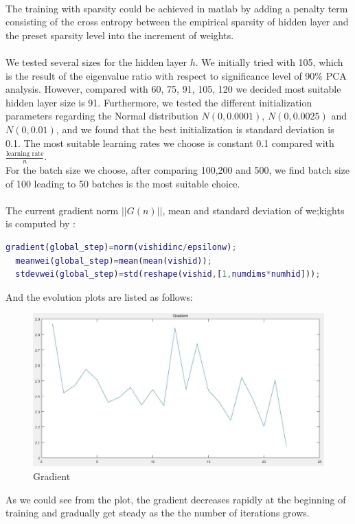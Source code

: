 \documentclass{article}
\begin{document}
\paragraph{}
The training with sparsity could be achieved in matlab by adding a penalty term consisting of the cross entropy between the empirical sparsity of hidden layer and the preset sparsity level into the increment of weights.
\paragraph{}
We tested several sizes for the hidden layer $h$. We initially tried with 105, which is the result of the eigenvalue ratio with respect to significance level of 90\% PCA analysis. However, compared with 60, 75, 91, 105, 120 we decided most suitable hidden layer size is 91. Furthermore, we tested the different initialization parameters regarding the Normal distribution $N(0,0.0001)$, $N(0,0.0025)$ and $N(0,0.01)$, and we found that the best initialization is standard deviation is 0.1. The most suitable learning rates we choose is constant 0.1 compared with $\frac{\text{learning rate}}n$. \\
For the batch size we choose, after comparing 100,200 and 500, we find batch size of 100 leading to 50 batches is the most suitable choice.

\paragraph{}
The current gradient norm $||G(n)||$, mean and standard deviation of we;kights is computed by :
\begin{lstlisting}[language=Matlab]
  gradient(global_step)=norm(vishidinc/epsilonw);
  meanwei(global_step)=mean(mean(vishid));
  stdevwei(global_step)=std(reshape(vishid,[1,numdims*numhid]));
\end{lstlisting}
And the evolution plots are listed as follows:
\begin{figure}[H]
 \centering
 \includegraphics[width=1.2\textwidth]{Gradient}
 \caption{Gradient}\label{}
 \end{figure}
As we could see from the plot, the gradient decreases rapidly at the beginning of training and gradually get steady as the the number of iterations grows.
\end{document}
